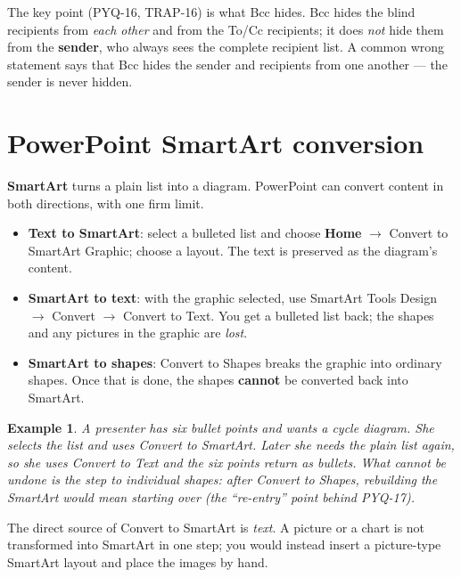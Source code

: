 \documentclass[11pt]{article}
\newtheorem{example}{Example}[section]
\begin{document}
The key point (PYQ-16, TRAP-16) is what Bcc hides. Bcc hides the blind
recipients from \emph{each other} and from the To/Cc recipients; it does
\emph{not} hide them from the \textbf{sender}, who always sees the complete
recipient list. A common wrong statement says that Bcc hides the sender and
recipients from one another --- the sender is never hidden.

\section{PowerPoint SmartArt conversion}
\textbf{SmartArt} turns a plain list into a diagram. PowerPoint can convert
content in both directions, with one firm limit.

\begin{itemize}
  \item \textbf{Text to SmartArt}: select a bulleted list and choose
    \textbf{Home} $\rightarrow$ Convert to SmartArt Graphic; choose a layout.
    The text is preserved as the diagram's content.
  \item \textbf{SmartArt to text}: with the graphic selected, use SmartArt
    Tools Design $\rightarrow$ Convert $\rightarrow$ Convert to Text. You get
    a bulleted list back; the shapes and any pictures in the graphic are
    \emph{lost}.
  \item \textbf{SmartArt to shapes}: Convert to Shapes breaks the graphic
    into ordinary shapes. Once that is done, the shapes \textbf{cannot} be
    converted back into SmartArt.
\end{itemize}

\begin{example}
A presenter has six bullet points and wants a cycle diagram. She selects the
list and uses \emph{Convert to SmartArt}. Later she needs the plain list
again, so she uses \emph{Convert to Text} and the six points return as
bullets. What cannot be undone is the step to individual shapes: after
\emph{Convert to Shapes}, rebuilding the SmartArt would mean starting over
(the ``re-entry'' point behind PYQ-17).
\end{example}

The direct source of Convert to SmartArt is \emph{text}. A picture or a chart
is not transformed into SmartArt in one step; you would instead insert a
picture-type SmartArt layout and place the images by hand.
\end{document}
